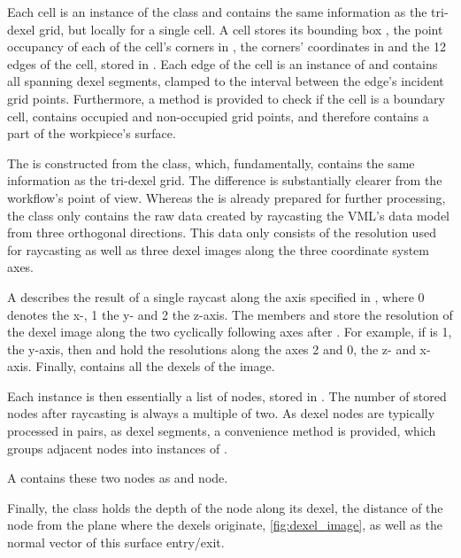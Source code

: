 Each cell is an instance of the  class and contains the same information as the tri-dexel grid, but locally for a single cell.
A cell stores its bounding box , the point occupancy of each of the cell's corners in , the corners' coordinates in  and the 12 edges of the cell, stored in .
Each edge of the cell is an instance of  and contains all spanning dexel segments, clamped to the interval between the edge's incident grid points.
Furthermore, a method  is provided to check if the cell is a boundary cell, \ie contains occupied and non-occupied grid points, and therefore contains a part of the workpiece's surface.

The  is constructed from the  class, which, fundamentally, contains the same information as the tri-dexel grid.
The difference is substantially clearer from the workflow's point of view.
Whereas the  is already prepared for further processing, the  class only contains the raw data created by raycasting the VML's data model from three orthogonal directions.
This data only consists of the resolution  used for raycasting as well as three dexel images  along the three coordinate system axes.

A  describes the result of a single raycast along the axis specified in , where 0 denotes the x-, 1 the y- and 2 the z-axis.
The members  and  store the resolution of the dexel image along the two cyclically following axes after .
For example, if  is 1, the y-axis, then  and  hold the resolutions along the axes 2 and 0, the z- and x-axis.
Finally,  contains all the dexels of the image.

Each  instance is then essentially a list of nodes, stored in .
The number of stored nodes after raycasting is always a multiple of two.
As dexel nodes are typically processed in pairs, as dexel segments, a convenience method  is provided, which groups adjacent nodes into instances of .

A  contains these two nodes as  and  node.

Finally, the  class holds the depth of the node along its dexel, \ie the distance of the node from the plane where the dexels originate, \cf \cref{fig:dexel_image}, as well as the normal vector of this surface entry/exit.

